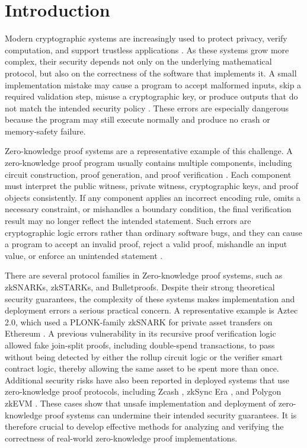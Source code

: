 \section{Introduction}
\label{sec:greybox-introduction}
Modern cryptographic systems are increasingly used to protect privacy, verify computation, and support trustless applications \cite{parno2016pinocchio, rauzy2014countermeasures}. As these systems grow more complex, their security depends not only on the underlying mathematical protocol, but also on the correctness of the software that implements it. A small implementation mistake may cause a program to accept malformed inputs, skip a required validation step, misuse a cryptographic key, or produce outputs that do not match the intended security policy \cite{lazar2014does,egele2013empirical,chau2019analyzing}. These errors are especially dangerous because the program may still execute normally and produce no crash or memory-safety failure.

Zero-knowledge proof systems are a representative example of this challenge. A zero-knowledge proof program usually contains multiple components, including circuit construction, proof generation, and proof verification \cite{groth2016size}. Each component must interpret the public witness, private witness, cryptographic keys, and proof objects consistently. If any component applies an incorrect encoding rule, omits a necessary constraint, or mishandles a boundary condition, the final verification result may no longer reflect the intended statement. Such errors are cryptographic logic errors rather than ordinary software bugs, and they can cause a program to accept an invalid proof, reject a valid proof, mishandle an input value, or enforce an unintended statement \cite{wen2024practical, tang2024zero}.

There are several protocol families in Zero-knowledge proof systems, such as zkSNARKs, zkSTARKs, and Bulletproofs. Despite their strong theoretical security guarantees, the complexity of these systems makes implementation and deployment errors a serious practical concern. A representative example is Aztec 2.0, which used a PLONK-family zkSNARK for private asset transfers on Ethereum \cite{aztec_vuln_2021}. A previous vulnerability in its recursive proof verification logic allowed fake join-split proofs, including double-spend transactions, to pass without being detected by either the rollup circuit logic or the verifier smart contract logic, thereby allowing the same asset to be spent more than once. Additional security risks have also been reported in deployed systems that use zero-knowledge proof protocols, including Zcash \cite{zcash_counterfeiting}, zkSync Era \cite{chainlight_zksync_2023}, and Polygon zkEVM \cite{verichains_polygon_zkevm_2024}. These cases show that unsafe implementation and deployment of zero-knowledge proof systems can undermine their intended security guarantees. It is therefore crucial to develop effective methods for analyzing and verifying the correctness of real-world zero-knowledge proof implementations.

